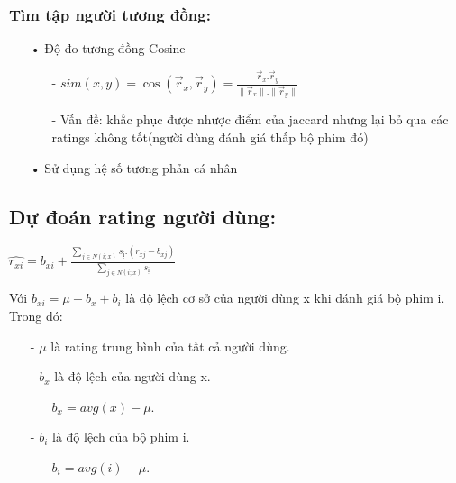 \documentclass[a0,portrait,11pt]{a0poster}
\begin{document}
\begin{multicols}{2}
\begin{mybox}
\subsubsection*{Tìm tập người tương đồng:}
\begin{itemize}
\item[•] Độ đo tương đồng Cosine
\begin{itemize}
\item[-] $sim(x,y) = \cos(\vec{r}_x , \vec{r}_y) = \frac{\vec{r}_x.\vec{r}_y}{\parallel \vec{r}_x \parallel . \parallel \vec{r}_y \parallel}$
\item[-] Vấn đề: khắc phục được nhược điểm của jaccard nhưng lại bỏ qua các ratings không tốt(người dùng đánh giá thấp bộ phim đó)
\end{itemize}
\item[•] Sử dụng hệ số tương phản cá nhân
\end{itemize}
\subsection*{Dự đoán rating người dùng:}
\begin{center}
\Large{
$\hat{r_{xi}} = b_{xi} + \frac{\sum_{j\in N(i;x)}s_{ị}.(r_{xj} - b_{xj})}{\sum_{j\in N(i;x)}s_{ị} }$
}
\end{center}
Với $b_{xi} = \mu + b_x + b_i$ là độ lệch cơ sở của người dùng x khi đánh giá bộ phim i. Trong đó:
\begin{itemize}
\item[-] $\mu$ là rating trung bình của tất cả người dùng.
\item[-] $b_x$ là độ lệch của người dùng x.
\begin{itemize}
\item[] $b_x = avg(x) - \mu $.
\end{itemize}
\item[-] $b_i$ là độ lệch của bộ phim i.
\begin{itemize}
\item[] $b_i = avg(i) - \mu $.
\end{itemize}
\end{itemize}
\end{mybox}
\begin{mybox}

\end{mybox}
\end{multicols}
\end{document}

